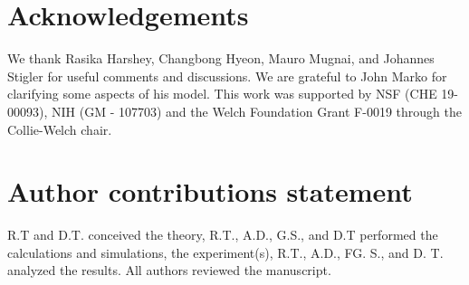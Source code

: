 \documentclass[fleqn,10pt]{wlscirep}
\begin{document}
\section*{Acknowledgements}
We thank Rasika Harshey, Changbong Hyeon, Mauro Mugnai, and Johannes Stigler for useful comments and discussions. We are grateful to John Marko for clarifying some aspects of his model.  This work was supported by NSF (CHE 19-00093), NIH (GM - 107703) and the Welch Foundation Grant F-0019 through the Collie-Welch chair. 

\section*{Author contributions statement}


R.T and D.T. conceived the theory,  R.T.,  A.D., G.S., and D.T performed the calculations and simulations, the experiment(s), R.T., A.D., FG. S., and D. T.  analyzed the results.  All authors reviewed the manuscript. 






\end{document}
